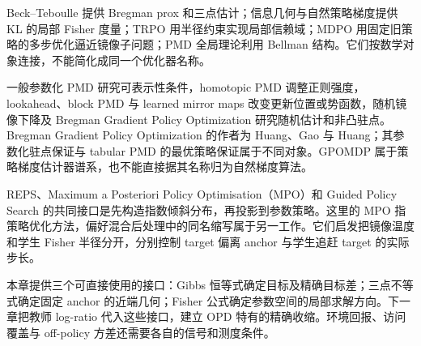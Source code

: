 Beck--Teboulle 提供 Bregman prox 和三点估计；信息几何与自然策略梯度提供 KL 的局部 Fisher 度量；TRPO 用半径约束实现局部信赖域；MDPO 用固定旧策略的多步优化逼近镜像子问题；PMD 全局理论利用 Bellman 结构。它们按数学对象连接，不能简化成同一个优化器名称。\cite{beck2003,amari1998,kakade01,trpo15,mdpo20,lan23,zhan2022}

一般参数化 PMD 研究可表示性条件，homotopic PMD 调整正则强度，lookahead、block PMD 与 learned mirror maps 改变更新位置或势函数，随机镜像下降及 Bregman Gradient Policy Optimization 研究随机估计和非凸驻点。Bregman Gradient Policy Optimization 的作者为 Huang、Gao 与 Huang；其参数化驻点保证与 tabular PMD 的最优策略保证属于不同对象。GPOMDP 属于策略梯度估计器谱系，也不能直接据其名称归为自然梯度算法。

REPS、Maximum a Posteriori Policy Optimisation（MPO）和 Guided Policy Search 的共同接口是先构造指数倾斜分布，再投影到参数策略。这里的 MPO 指策略优化方法，偏好混合后处理中的同名缩写属于另一工作。它们启发把镜像温度和学生 Fisher 半径分开，分别控制 target 偏离 anchor 与学生追赶 target 的实际步长。\cite{mpo18}

本章提供三个可直接使用的接口：Gibbs 恒等式确定目标及精确目标差；三点不等式确定固定 anchor 的近端几何；Fisher 公式确定参数空间的局部求解方向。下一章把教师 log-ratio 代入这些接口，建立 OPD 特有的精确收缩。环境回报、访问覆盖与 off-policy 方差还需要各自的信号和测度条件。
